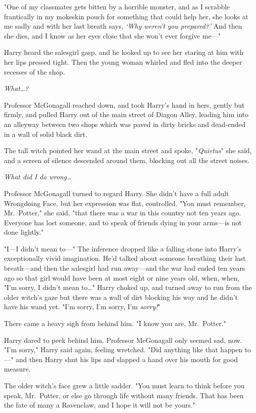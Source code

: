 "One of my classmates gets bitten by a horrible monster, and as I scrabble
frantically in my mokeskin pouch for something that could help her, she looks
at me sadly and with her last breath says, \emph{`Why weren't you prepared?'}
And then she dies, and I know as her eyes close that she won't ever forgive
me---"

Harry heard the salesgirl gasp, and he looked up to see her staring at him with
her lips pressed tight. Then the young woman whirled and fled into the deeper
recesses of the shop.

\emph{What{\ldots}?}

Professor McGonagall reached down, and took Harry's hand in hers, gently but
firmly, and pulled Harry out of the main street of Diagon Alley, leading him
into an alleyway between two shops which was paved in dirty bricks and
dead-ended in a wall of solid black dirt.

The tall witch pointed her wand at the main street and spoke, "\emph{Quietus}"
she said, and a screen of silence descended around them, blocking out all the
street noises.

\emph{What did I do wrong{\ldots}}

Professor McGonagall turned to regard Harry. She didn't have a full adult
Wrongdoing Face, but her expression was flat, controlled. "You must remember,
Mr.~Potter," she said, "that there was a war in this country not ten years ago.
Everyone has lost someone, and to speak of friends dying in your arms---is not
done lightly."

"I---I didn't mean to---" The inference dropped like a falling stone into
Harry's exceptionally vivid imagination. He'd talked about someone breathing
their last breath---and then the salesgirl had run away---and the war had ended
ten years ago so that girl would have been at most eight or nine years old,
when, when, "I'm sorry, I didn't mean to{\ldots}" Harry choked up, and turned
away to run from the older witch's gaze but there was a wall of dirt blocking
his way and he didn't have his wand yet. "I'm sorry, I'm sorry, I'm
\emph{sorry!}"

There came a heavy sigh from behind him. "I know you are, Mr.~Potter."

Harry dared to peek behind him. Professor McGonagall only seemed sad, now. "I'm
sorry," Harry said again, feeling wretched. "Did anything like that happen
to---" and then Harry shut his lips and slapped a hand over his mouth for good
measure.

The older witch's face grew a little sadder. "You must learn to think before
you speak, Mr.~Potter, or else go through life without many friends. That has
been the fate of many a Ravenclaw, and I hope it will not be yours."

